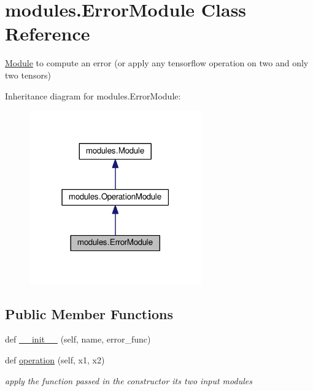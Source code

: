 \hypertarget{classmodules_1_1_error_module}{}\section{modules.\+Error\+Module Class Reference}
\label{classmodules_1_1_error_module}


\hyperlink{classmodules_1_1_module}{Module} to compute an error (or apply any tensorflow operation on two and only two tensors)  




Inheritance diagram for modules.\+Error\+Module\+:\nopagebreak
\begin{figure}[H]
\begin{center}
\leavevmode
\includegraphics[width=210pt]{classmodules_1_1_error_module__inherit__graph}
\end{center}
\end{figure}
\subsection*{Public Member Functions}
\begin{DoxyCompactItemize}
\item 
def \hyperlink{classmodules_1_1_error_module_ac657fdedba3e5af8e96faf1e9fdfdbdf}{\+\_\+\+\_\+init\+\_\+\+\_\+} (self, name, error\+\_\+func)
\item 
\mbox{\label{classmodules_1_1_error_module_a276b0c608f97bafccb52e264f1e2cdfd}} 
def \hyperlink{classmodules_1_1_error_module_a276b0c608f97bafccb52e264f1e2cdfd}{operation} (self, x1, x2)
\begin{DoxyCompactList}\small\item\em apply the function passed in the constructor its two input modules \end{DoxyCompactList}\end{DoxyCompactItemize}
